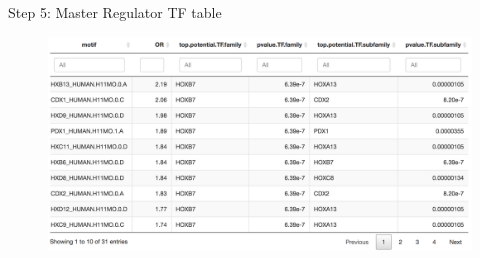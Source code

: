 \documentclass[slidestop,compress,11pt,xcolor=dvipsnames]{beamer}
\begin{document}

\begin{frame}{Step 5: Master Regulator TF table}
 \vspace{-0.5cm}
 \begin{figure}
  \hspace*{-0.5cm}
  \includegraphics[width=1.1\linewidth]{ELMER/TF_tbl.png}
 \end{figure}
\end{frame}
\end{document}
